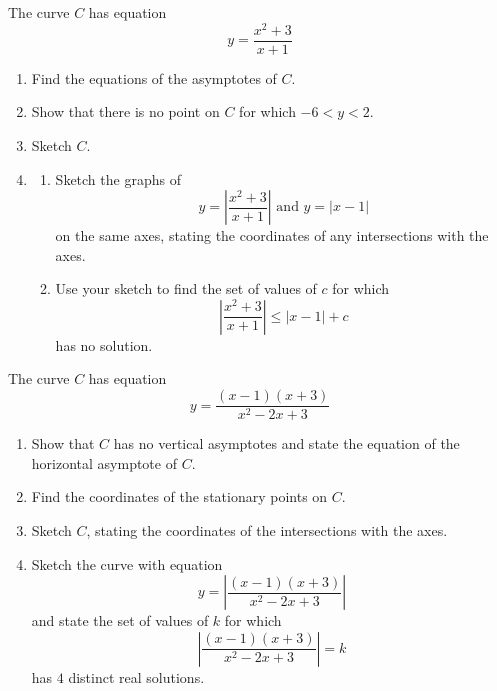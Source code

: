 \documentclass[leqno]{article}
\begin{document}
\begin{enumerate}[
  label=\textbf{\arabic*.},
  leftmargin=*,
  topsep=0pt,
  partopsep=0pt,
  parsep=0pt
]
\newpage

\questionitem

The curve $C$ has equation
\[
y=\frac{x^2+3}{x+1}
\]
\begin{enumerate}[label=\textbf{(\alph*)}]
  \item Find the equations of the asymptotes of $C$.  \\
  \item Show that there is no point on $C$ for which $-6<y<2$.  \\
  \item Sketch $C$.  \\
  \item
  \begin{enumerate}[label=(\roman*)]
    \item Sketch the graphs of
    \[
    y=\left|\frac{x^2+3}{x+1}\right| \text{ and } y=|x-1|
    \]
    on the same axes, stating the coordinates of any intersections with the axes. 
    \item Use your sketch to find the set of values of $c$ for which
    \[
    \left|\frac{x^2+3}{x+1}\right| \le |x-1|+c
    \]
    has no solution. 
  \end{enumerate}
\end{enumerate}

\newpage

\questionitem

The curve $C$ has equation
\[
y=\frac{(x-1)(x+3)}{x^2-2x+3}
\]
\begin{enumerate}[label=\textbf{(\alph*)}]
  \item Show that $C$ has no vertical asymptotes and state the equation of the horizontal asymptote of $C$.  \\
  \item Find the coordinates of the stationary points on $C$.  \\
  \item Sketch $C$, stating the coordinates of the intersections with the axes.  \\
  \item Sketch the curve with equation
  \[
  y=\left|\frac{(x-1)(x+3)}{x^2-2x+3}\right|
  \]
  and state the set of values of $k$ for which
  \[
  \left|\frac{(x-1)(x+3)}{x^2-2x+3}\right|=k
  \]
  has $4$ distinct real solutions.  \\
\end{enumerate}


\end{enumerate}
\end{document}
